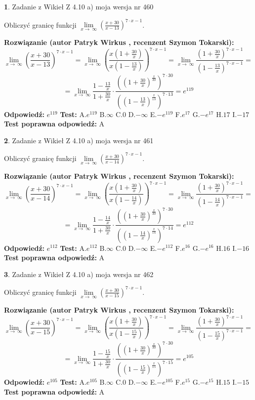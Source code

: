 \documentclass[12pt, a4paper]{article}
\theoremstyle{definition} %
\newtheorem{zad}{}
\newcommand{\zadStart}[1]{\begin{zad}#1\newline}
\newcommand{\zadStop}{\end{zad}}
\newcommand{\rozwStart}[2]{\noindent \textbf{Rozwiązanie (autor #1 , recenzent #2): }\newline}
\newcommand{\rozwStop}{\newline}
\newcommand{\odpStart}{\noindent \textbf{Odpowiedź:}\newline}
\newcommand{\odpStop}{\newline}
\newcommand{\testStart}{\noindent \textbf{Test:}\newline}
\newcommand{\testStop}{\newline}
\newcommand{\kluczStart}{\noindent \textbf{Test poprawna odpowiedź:}\newline}
\newcommand{\kluczStop}{\newline}
\begin{document}
\zadStart{Zadanie z Wikieł Z 4.10 a) moja wersja nr 460}

Obliczyć granicę funkcji  $\lim\limits_{x\to\ \infty}(\frac{x+30}{x-13})^{7\cdot x-1}$.
\zadStop
\rozwStart{Patryk Wirkus}{Szymon Tokarski}
$$\lim\limits_{x\to\ \infty}(\frac{x+30}{x-13})^{7\cdot x-1} = \lim\limits_{x\to\ \infty}(\frac{x(1+\frac{30}{x})}{x(1-\frac{13}{x})})^{7\cdot x-1}=\lim\limits_{x\to\ \infty}\frac{(1+\frac{30}{x})^{7\cdot x-1}}{(1-\frac{13}{x})^{7\cdot x-1}}=$$
$$=\lim\limits_{x\to\ \infty}\frac{1-\frac{13}{x}}{1+\frac{30}{x}}\cdot\frac{((1+\frac{30}{x})^{\frac{x}{30}})^{7\cdot30}}{((1-\frac{13}{x})^{\frac{x}{13}})^{7\cdot13}}=e^{119}$$
\rozwStop
\odpStart
$e^{119}$
\odpStop
\testStart
A.$e^{119}$ B.$\infty$ C.$0$ D.$-\infty$ E.$-e^{119}$
F.$e^{17}$ G.$-e^{17}$
H.$17$
I.$-17$
\testStop
\kluczStart
A
\kluczStop



\zadStart{Zadanie z Wikieł Z 4.10 a) moja wersja nr 461}

Obliczyć granicę funkcji  $\lim\limits_{x\to\ \infty}(\frac{x+30}{x-14})^{7\cdot x-1}$.
\zadStop
\rozwStart{Patryk Wirkus}{Szymon Tokarski}
$$\lim\limits_{x\to\ \infty}(\frac{x+30}{x-14})^{7\cdot x-1} = \lim\limits_{x\to\ \infty}(\frac{x(1+\frac{30}{x})}{x(1-\frac{14}{x})})^{7\cdot x-1}=\lim\limits_{x\to\ \infty}\frac{(1+\frac{30}{x})^{7\cdot x-1}}{(1-\frac{14}{x})^{7\cdot x-1}}=$$
$$=\lim\limits_{x\to\ \infty}\frac{1-\frac{14}{x}}{1+\frac{30}{x}}\cdot\frac{((1+\frac{30}{x})^{\frac{x}{30}})^{7\cdot30}}{((1-\frac{14}{x})^{\frac{x}{14}})^{7\cdot14}}=e^{112}$$
\rozwStop
\odpStart
$e^{112}$
\odpStop
\testStart
A.$e^{112}$ B.$\infty$ C.$0$ D.$-\infty$ E.$-e^{112}$
F.$e^{16}$ G.$-e^{16}$
H.$16$
I.$-16$
\testStop
\kluczStart
A
\kluczStop



\zadStart{Zadanie z Wikieł Z 4.10 a) moja wersja nr 462}

Obliczyć granicę funkcji  $\lim\limits_{x\to\ \infty}(\frac{x+30}{x-15})^{7\cdot x-1}$.
\zadStop
\rozwStart{Patryk Wirkus}{Szymon Tokarski}
$$\lim\limits_{x\to\ \infty}(\frac{x+30}{x-15})^{7\cdot x-1} = \lim\limits_{x\to\ \infty}(\frac{x(1+\frac{30}{x})}{x(1-\frac{15}{x})})^{7\cdot x-1}=\lim\limits_{x\to\ \infty}\frac{(1+\frac{30}{x})^{7\cdot x-1}}{(1-\frac{15}{x})^{7\cdot x-1}}=$$
$$=\lim\limits_{x\to\ \infty}\frac{1-\frac{15}{x}}{1+\frac{30}{x}}\cdot\frac{((1+\frac{30}{x})^{\frac{x}{30}})^{7\cdot30}}{((1-\frac{15}{x})^{\frac{x}{15}})^{7\cdot15}}=e^{105}$$
\rozwStop
\odpStart
$e^{105}$
\odpStop
\testStart
A.$e^{105}$ B.$\infty$ C.$0$ D.$-\infty$ E.$-e^{105}$
F.$e^{15}$ G.$-e^{15}$
H.$15$
I.$-15$
\testStop
\kluczStart
A
\kluczStop
\end{document}

